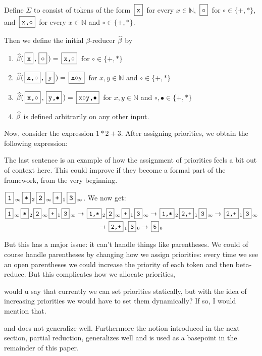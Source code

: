 \documentclass{llncs}
\newcommand{\yoni}[1]{{\begin{mdframed}[linecolor=red]{\color{red}#1}\end{mdframed}}}
\begin{document}


\begin{example}
Define $\Sigma$ to consist of tokens of the form $\mbt{x}$ 
for every $x\in\mathbb{N}$, 
$\mb\circ$ for $\circ\in\{+,*\}$, and $\mbt{x,$\circ$}$
for every $x\in\mathbb{N}$
and $\circ\in\{+,*\}$.

Then we define the initial $\beta$-reducer $\widehat\beta$ by
\begin{enumerate}
    \item $\hb(\mbt x,\mb\circ)=\mbt{x,$\circ$}$ for $\circ\in\{+,*\}$
    \item $\hb(\mbt{x,$\circ$},\mbt y)=\mbt{x$\circ$y}$ for 
    $x,y\in\mathbb{N}$ and $\circ\in\{+,*\}$
    \item $\hb(\mbt{x,$\circ$},\mbt{y,$\bullet$})=\mbt{x$\circ$y,$\bullet$}$ 
    for $x,y\in\mathbb{N}$ and $\circ,\bullet\in\{+,*\}$
    \item $\widehat\beta$ is defined arbitrarily on any other input.
\end{enumerate}

Now, consider the expression $1*2+3$. 
After assigning priorities, we obtain
the following expression:
\yoni{The last sentence is an example of how the assignment
of priorities feels a bit out of context here. This could improve
if they become a formal part of the framework, from the very beginning.}
$\mbt1_\infty \mbt*_2 \mbt2_\infty \mbt+_1 \mbt3_\infty$.
We now get:
\begin{multline*}
    \mbt1_\infty \mbt*_2 \mbt2_\infty \mbt+_1 \mbt3_\infty \to \mbt{1,*}_2 \mbt2_\infty \mbt+_1 \mbt3_\infty \to \mbt{1,*}_2 \mbt{2,+}_1 \mbt3_\infty \to \mbt{2,+}_1 \mbt3_\infty\\
    \to \mbt{2,+}_1 \mbt3_0 \to \mbt5_0
\end{multline*}
\end{example}

But this has a major issue: it can't handle things like parentheses.
We could of course handle parentheses by changing how we assign priorities: every time we see an open parentheses we could increase
the priority of each token and then beta-reduce.
But this complicates how we allocate priorities, 
\yoni{would u say that currently we can set priorities statically, but with
the idea of increasing priorities we would have to set them dynamically?
If so, I would mention that.}
and does not generalize well.
Furthermore the notion introduced in the next section, partial reduction, generalizes well and is used as a basepoint in the
remainder of this paper.
\end{document}

